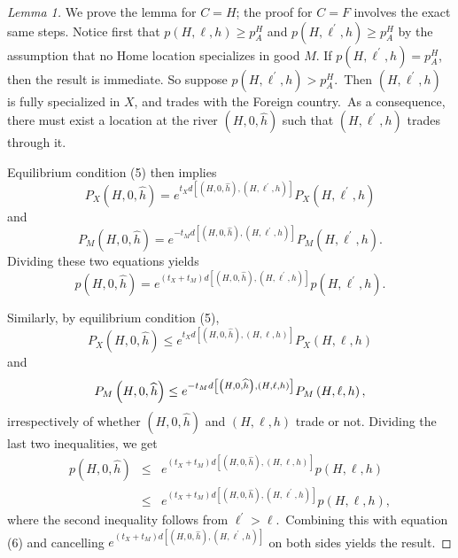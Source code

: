 \documentclass[12pt]{article}
\begin{document}
\begin{proof}[Lemma 1]
We prove the lemma for $C=H$; the proof for $C=F$ involves the exact same
steps. Notice first that $p\left( H,\ell ,h\right) \geq p_{A}^{H}$ and $%
p\left( H,\ell ^{\prime },h\right) \geq p_{A}^{H}$ by the assumption that no
Home location specializes in good $M$. If $p\left( H,\ell ^{\prime
},h\right) =p_{A}^{H}$, then the result is immediate. So suppose $p\left(
H,\ell ^{\prime },h\right) >p_{A}^{H}$.\ Then $\left( H,\ell ^{\prime
},h\right) $ is fully specialized in $X$, and trades with the Foreign
country.\ As a consequence, there must exist a location at the river $\left(
H,0,\widehat{h}\right) $ such that $\left( H,\ell ^{\prime },h\right) $
trades through it.

Equilibrium condition (5) then implies%
\begin{equation*}
P_{X}\left( H,0,\widehat{h}\right) =e^{t_{X}d\left[ \left( H,0,\widehat{h}%
\right) ,\left( H,\ell ^{\prime },h\right) \right] }P_{X}\left( H,\ell
^{\prime },h\right) 
\end{equation*}%
and%
\begin{equation*}
P_{M}\left( H,0,\widehat{h}\right) =e^{-t_{M}d\left[ \left( H,0,\widehat{h}%
\right) ,\left( H,\ell ^{\prime },h\right) \right] }P_{M}\left( H,\ell
^{\prime },h\right) .
\end{equation*}%
Dividing these two equations yields%
\begin{equation}
p\left( H,0,\widehat{h}\right) =e^{\left( t_{X}+t_{M}\right) d\left[ \left(
H,0,\widehat{h}\right) ,\left( H,\ell ^{\prime },h\right) \right] }p\left(
H,\ell ^{\prime },h\right) .
\end{equation}

Similarly, by equilibrium condition (5),%
\begin{equation*}
P_{X}\left( H,0,\widehat{h}\right) \leq e^{t_{X}d\left[ \left( H,0,\widehat{h%
}\right) ,\left( H,\ell ,h\right) \right] }P_{X}\left( H,\ell ,h\right) 
\end{equation*}%
and%
\begin{equation*}
P_{M}\left( H,0,\widehat{h}\right) \leq e^{-t_{M}d\left[ \left( H,0,\widehat{%
h}\right) ,\left( H,\ell ,h\right) \right] }P_{M}\left( H,\ell ,h\right) ,
\end{equation*}%
irrespectively of whether $\left( H,0,\widehat{h}\right) $ and $\left(
H,\ell ,h\right) $ trade or not. Dividing the last two inequalities, we get%
\begin{eqnarray*}
p\left( H,0,\widehat{h}\right)  &\leq &e^{\left( t_{X}+t_{M}\right) d\left[
\left( H,0,\widehat{h}\right) ,\left( H,\ell ,h\right) \right] }p\left(
H,\ell ,h\right)  \\
&\leq &e^{\left( t_{X}+t_{M}\right) d\left[ \left( H,0,\widehat{h}\right)
,\left( H,\ell ^{\prime },h\right) \right] }p\left( H,\ell ,h\right) ,
\end{eqnarray*}%
where the second inequality follows from $\ell ^{\prime }>\ell $.\ Combining
this with equation (6) and cancelling $e^{\left( t_{X}+t_{M}\right) d\left[
\left( H,0,\widehat{h}\right) ,\left( H,\ell ^{\prime },h\right) \right] }$
on both sides yields the result.
\end{proof}
\end{document}
